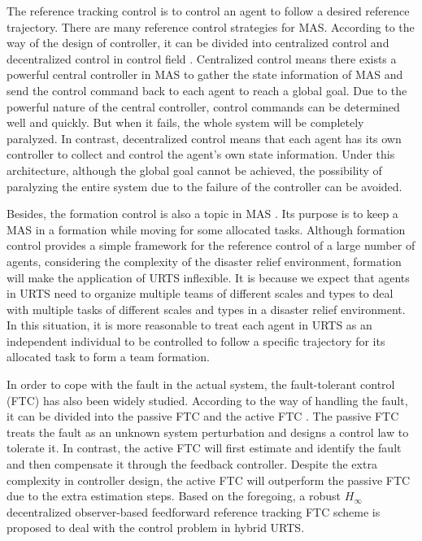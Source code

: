 \documentclass{ieeeaccess}
\begin{document}
The reference tracking control is to control an agent to follow a desired reference trajectory. There are many reference control strategies for MAS. According to the way of the design of controller, it can be divided into centralized control and decentralized control in control field \cite{8931370}. Centralized control means there exists a powerful central controller in MAS to gather the state information of MAS and send the control command back to each agent to reach a global goal. Due to the powerful nature of the central controller, control commands can be determined well and quickly. But when it fails, the whole system will be completely paralyzed. In contrast, decentralized control means that each agent has its own controller to collect and control the agent's own state information. Under this architecture, although the global goal cannot be achieved, the possibility of paralyzing the entire system due to the failure of the controller can be avoided.

Besides, the formation control is also a topic in MAS \cite{wang2022consensus}. Its purpose is to keep a MAS in a formation while moving for some allocated tasks. Although formation control provides a simple framework for the reference control of a large number of agents, considering the complexity of the disaster relief environment, formation will make the application of URTS inflexible. It is because we expect that agents in URTS need to organize multiple teams of different scales and types to deal with multiple tasks of different scales and types in a disaster relief environment. In this situation, it is more reasonable to treat each agent in URTS as an independent individual to be controlled to follow a specific trajectory for its allocated task to form a team formation.

In order to cope with the fault in the actual system, the fault-tolerant control (FTC) has also been widely studied. According to the way of handling the fault, it can be divided into the passive FTC and the active FTC \cite{6669235}. The passive FTC treats the fault as an unknown system perturbation and designs a control law to tolerate it. In contrast, the active FTC will first estimate and identify the fault and then compensate it through the feedback controller. Despite the extra complexity in controller design, the active FTC will outperform the passive FTC due to the extra estimation steps. Based on the foregoing, a robust $H_\infty$ decentralized observer-based feedforward reference tracking FTC scheme is proposed to deal with the control problem in hybrid URTS.
\end{document}
